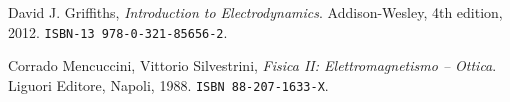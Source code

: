\documentclass[b5paper,twoside]{book}
\begin{document}
\begin{thebibliography}{9}

  David J. Griffiths,
  \emph{Introduction to Electrodynamics}.
  Addison-Wesley, 
  4th edition,
  2012.
  \texttt{ISBN-13 978-0-321-85656-2}.

  Corrado Mencuccini, Vittorio Silvestrini,
  \emph{Fisica II: Elettromagnetismo -- Ottica}.
  Liguori Editore, Napoli,
  1988.
  \texttt{ISBN 88-207-1633-X}.

\end{thebibliography}
\end{document}
